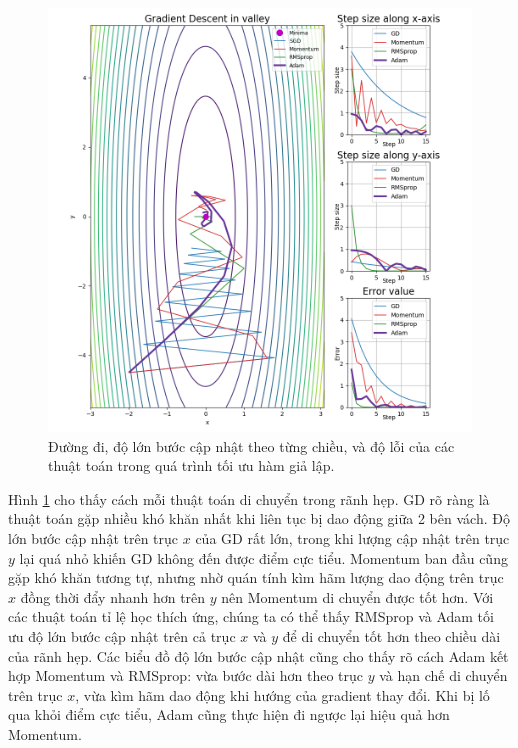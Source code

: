 \begin{figure}[htp]
	\centering
	\includegraphics[width=140 mm]{images/step-size.png}
	\caption{Đường đi, độ lớn bước cập nhật theo từng chiều, và độ lỗi của các thuật toán trong quá trình tối ưu hàm giả lập.}
	\label{fig:aligned-step-size}
\end{figure}

Hình \ref{fig:aligned-step-size} cho thấy cách mỗi thuật toán di chuyển trong rãnh hẹp. GD rõ ràng là thuật toán gặp nhiều khó khăn nhất khi liên tục bị dao động giữa 2 bên vách. Độ lớn bước cập nhật trên trục $x$ của GD rất lớn, trong khi lượng cập nhật trên trục $y$ lại quá nhỏ khiến GD không đến được điểm cực tiểu. Momentum ban đầu cũng gặp khó khăn tương tự, nhưng nhờ quán tính kìm hãm lượng dao động trên trục $x$ đồng thời đẩy nhanh hơn trên $y$ nên Momentum di chuyển được tốt hơn. Với các thuật toán tỉ lệ học thích ứng, chúng ta có thể thấy RMSprop và Adam tối ưu độ lớn bước cập nhật trên cả trục $x$ và $y$ để di chuyển tốt hơn theo chiều dài của rãnh hẹp. Các biểu đồ độ lớn bước cập nhật cũng cho thấy rõ cách Adam kết hợp Momentum và RMSprop: vừa bước dài hơn theo trục $y$ và hạn chế di chuyển trên trục $x$, vừa kìm hãm dao động khi hướng của gradient thay đổi. Khi bị lố qua khỏi điểm cực tiểu, Adam cũng thực hiện đi ngược lại hiệu quả hơn Momentum.

